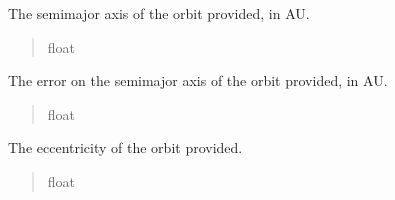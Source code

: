 \documentclass[letterpaper,11pt,english]{sphinxmanual}
\begin{document}
\begin{savenotes}
\begin{fulllineitems}
\begin{savenotes}\begin{fulllineitems}
\label{\detokenize{code/opihiexarata.orbit.custom:opihiexarata.orbit.custom.CustomOrbitEngine.semimajor_axis}}
\pysigstartsignatures
{}
\pysigstopsignatures
\sphinxAtStartPar
The semi\sphinxhyphen{}major axis of the orbit provided, in AU.
\begin{quote}\begin{description}
\sphinxAtStartPar
float

\end{description}\end{quote}

\end{fulllineitems}\end{savenotes}


\begin{savenotes}\begin{fulllineitems}
\label{\detokenize{code/opihiexarata.orbit.custom:opihiexarata.orbit.custom.CustomOrbitEngine.semimajor_axis_error}}
\pysigstartsignatures
{}
\pysigstopsignatures
\sphinxAtStartPar
The error on the semi\sphinxhyphen{}major axis of the orbit provided, in AU.
\begin{quote}\begin{description}
\sphinxAtStartPar
float

\end{description}\end{quote}

\end{fulllineitems}\end{savenotes}


\begin{savenotes}\begin{fulllineitems}
\label{\detokenize{code/opihiexarata.orbit.custom:opihiexarata.orbit.custom.CustomOrbitEngine.eccentricity}}
\pysigstartsignatures
{}
\pysigstopsignatures
\sphinxAtStartPar
The eccentricity of the orbit provided.
\begin{quote}\begin{description}
\sphinxAtStartPar
float


\end{description}
\end{quote}
\end{fulllineitems}
\end{savenotes}
\end{fulllineitems}
\end{savenotes}
\end{document}
